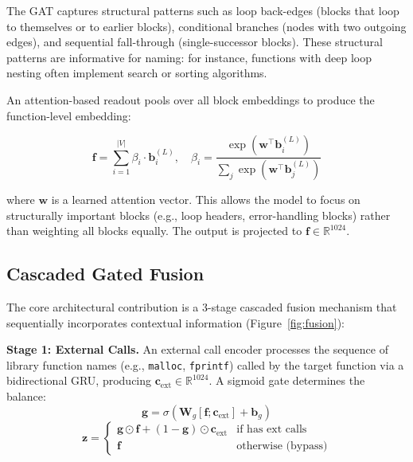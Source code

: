 \documentclass[sigconf,nonacm]{acmart}
\begin{document}
The GAT captures structural patterns such as loop back-edges (blocks that loop to themselves or to earlier blocks), conditional branches (nodes with two outgoing edges), and sequential fall-through (single-successor blocks). These structural patterns are informative for naming: for instance, functions with deep loop nesting often implement search or sorting algorithms.

An attention-based readout pools over all block embeddings to produce the function-level embedding:

\begin{equation}
    \mathbf{f} = \sum_{i=1}^{|V|} \beta_i \cdot \mathbf{b}_i^{(L)}, \quad \beta_i = \frac{\exp(\mathbf{w}^\top \mathbf{b}_i^{(L)})}{\sum_{j} \exp(\mathbf{w}^\top \mathbf{b}_j^{(L)})}
\end{equation}

where $\mathbf{w}$ is a learned attention vector. This allows the model to focus on structurally important blocks (e.g., loop headers, error-handling blocks) rather than weighting all blocks equally. The output is projected to $\mathbf{f} \in \mathbb{R}^{1024}$.

\subsection{Cascaded Gated Fusion}
\label{sec:fusion}

The core architectural contribution is a 3-stage cascaded fusion mechanism that sequentially incorporates contextual information (Figure~\ref{fig:fusion}):

\textbf{Stage 1: External Calls.} An external call encoder processes the sequence of library function names (e.g., \texttt{malloc}, \texttt{fprintf}) called by the target function via a bidirectional GRU, producing $\mathbf{c}_\text{ext} \in \mathbb{R}^{1024}$. A sigmoid gate determines the balance:
\begin{equation}
    \mathbf{g} = \sigma(\mathbf{W}_g [\mathbf{f}; \mathbf{c}_\text{ext}] + \mathbf{b}_g)
\end{equation}
\begin{equation}
    \mathbf{z} = \begin{cases}
        \mathbf{g} \odot \mathbf{f} + (1 - \mathbf{g}) \odot \mathbf{c}_\text{ext} & \text{if has ext calls} \\
        \mathbf{f} & \text{otherwise (bypass)}
    \end{cases}
\end{equation}
\end{document}

